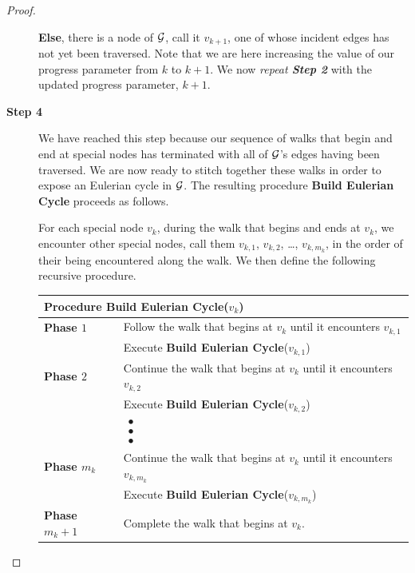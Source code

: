 \begin{proof}
\begin{description}
\smallskip

{\bf Else}, there is a node of $\mbox{$\cal G$}$, call it $v_{k+1}$, one of whose
incident edges has not yet been traversed.  Note that we are here
increasing the value of our progress parameter from $k$ to $k+1$.  We
now {\it repeat {\bf Step 2}} with the updated progress parameter,
$k+1$.

\item[{\bf Step 4}]
We have reached this step because our sequence of walks that begin and
end at special nodes has terminated with all of $\mbox{$\cal G$}$'s edges having
been traversed.  We are now ready to stitch together these walks in
order to expose an Eulerian cycle in $\mbox{$\cal G$}$.  The resulting procedure
{\bf Build Eulerian Cycle} proceeds as follows.

For each special node $v_k$, during the walk that begins and ends at
$v_k$, we encounter other special nodes, call them $v_{k,1}$,
$v_{k,2}$, \ldots, $v_{k,{m_k}}$, in the order of their being
encountered along the walk.  We then define the following recursive
procedure.

\medskip

\begin{tabular}{|ll|}
\multicolumn{2}{l}{{\bf Procedure Build Eulerian Cycle}($v_k$)} \\
\hline
{\bf Phase $1$} &
Follow the walk that begins at $v_k$ until it encounters $v_{k,1}$ \\
  &
Execute {\bf Build Eulerian Cycle}($v_{k,1}$) \\
\hline
{\bf Phase $2$} &
Continue the walk that begins at $v_k$ until it encounters $v_{k,2}$ \\
  &
Execute {\bf Build Eulerian Cycle}($v_{k,2}$) \\
\hline
  &
$\begin{array}{c}
\bullet \\
\bullet \\
\bullet
\end{array}
$ \\
\hline
{\bf Phase $m_k$} &
Continue the walk that begins at $v_k$ until it encounters $v_{k,m_k}$ \\
   &
Execute {\bf Build Eulerian Cycle}($v_{k,m_k}$) \\
\hline
{\bf Phase $m_k +1$} &
Complete the walk that begins at $v_k$. \\
\hline
\end{tabular}
\end{description}

\medskip


\end{proof}
